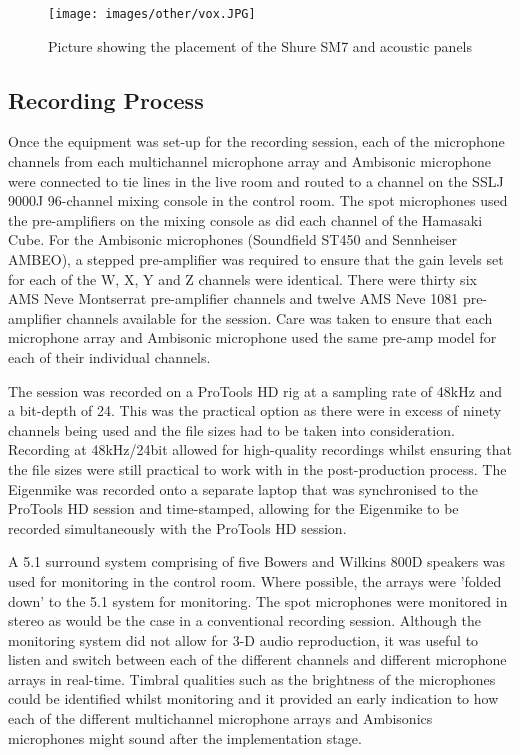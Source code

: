 				\begin{figure}[ht]
				\begin{center}
					\texttt{[image: images/other/vox.JPG]}
					\caption{Picture showing the placement of the Shure SM7 and acoustic panels}
					\label{voxmic}
				\end{center}
				\end{figure}


	\subsection{Recording Process}
		Once the equipment was set-up for the recording session, each of the microphone channels from each multichannel microphone array and Ambisonic microphone were connected to tie lines in the live room and routed to a channel on the SSLJ 9000J 96-channel mixing console in the control room. The spot microphones used the pre-amplifiers on the mixing console as did each channel of the Hamasaki Cube. For the Ambisonic microphones (Soundfield ST450 and Sennheiser AMBEO), a stepped pre-amplifier was required to ensure that the gain levels set for each of the W, X, Y and Z channels were identical. There were thirty six AMS Neve Montserrat pre-amplifier channels and twelve AMS Neve 1081 pre-amplifier channels available for the session. Care was taken to ensure that each microphone array and Ambisonic microphone used the same pre-amp model for each of their individual channels. 

		The session was recorded on a ProTools HD rig \cite{ProToolsHD} at a sampling rate of 48kHz and a bit-depth of 24. This was the practical option as there were in excess of ninety channels being used and the file sizes had to be taken into consideration. Recording at 48kHz/24bit allowed for high-quality recordings whilst ensuring that the file sizes were still practical to work with in the post-production process. The Eigenmike was recorded onto a separate laptop that was synchronised to the ProTools HD session and time-stamped, allowing for the Eigenmike to be recorded simultaneously with the ProTools HD session.

		A 5.1 surround system comprising of five Bowers and Wilkins 800D speakers was used for monitoring in the control room. Where possible, the arrays were 'folded down' to the 5.1 system for monitoring. The spot microphones were monitored in stereo as would be the case in a conventional recording session. Although the monitoring system did not allow for 3-D audio reproduction, it was useful to listen and switch between each of the different channels and different microphone arrays in real-time. Timbral qualities such as the brightness of the microphones could be identified whilst monitoring and it provided an early indication to how each of the different multichannel microphone arrays and Ambisonics microphones might sound after the implementation stage.

